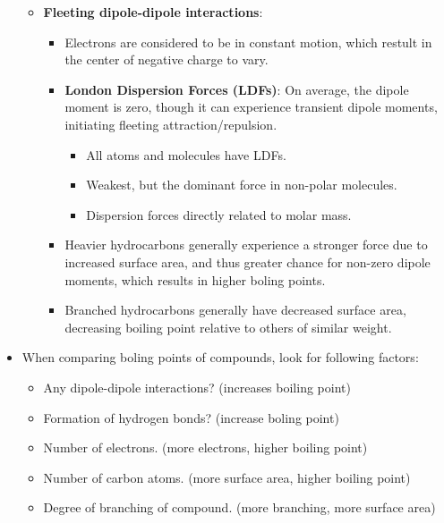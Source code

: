 \documentclass[12pt,a4paper]{article}
\begin{document}
\begin{itemize}
\begin{itemize}
            \item \textbf{Fleeting dipole-dipole interactions}:
                \begin{itemize}
                    \item Electrons are considered to be in constant motion, which restult in the center of negative charge to vary.
                    \item \textbf{London Dispersion Forces (LDFs)}: On average, the dipole moment is zero, though it can experience transient dipole moments, initiating fleeting attraction/repulsion.
                        \begin{itemize}
                            \item All atoms and molecules have LDFs.
                            \item Weakest, but the dominant force in non-polar molecules.
                            \item Dispersion forces directly related to molar mass.
                        \end{itemize}
                    \item Heavier hydrocarbons generally experience a stronger force due to increased surface area, and thus greater chance for non-zero dipole moments, which results in higher boling points.
                    \item Branched hydrocarbons generally have decreased surface area, decreasing boiling point relative to others of similar weight.
                \end{itemize}
        \end{itemize}
    \item When comparing boling points of compounds, look for following factors:
        \begin{itemize}
            \item Any dipole-dipole interactions? (increases boiling point)
            \item Formation of hydrogen bonds? (increase boling point)
            \item Number of electrons. (more electrons, higher boiling point)
            \item Number of carbon atoms. (more surface area, higher boiling point)
            \item Degree of branching of compound. (more branching, more surface area)
        \end{itemize}
\end{itemize}
\end{document}
